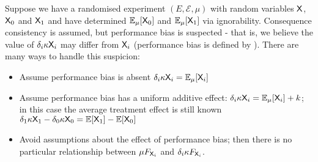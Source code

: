 \begin{example}\label{ex:nonst_distn}
Suppose we have a randomised experiment $(E,\mathcal{E},\mu)$ with random variables $\mathsf{X}$, $\mathsf{X}_0$ and $\mathsf{X}_1$ and have determined $\mathbb{E}_\mu[\mathsf{X}_0]$ and $\mathbb{E}_\mu[\mathsf{X}_1]$ via ignorability. Consequence consistency is assumed, but performance bias is suspected - that is, we believe the value of $\delta_i \kappa \mathsf{X}_i$ may differ from $\mathsf{X}_i$ (performance bias is defined by \cite{collaboration_cochrane_nodate}). There are many ways to handle this suspicion:
\begin{itemize}
    \item Assume performance bias is absent $\delta_i \kappa \mathsf{X}_i = \mathbb{E}_\mu[\mathsf{X}_i]$
    \item Assume performance bias has a uniform additive effect: $\delta_i \kappa \mathsf{X}_i = \mathbb{E}_\mu[\mathsf{X}_i]+k$; in this case the average treatment effect is still known $\delta_1 \kappa \mathsf{X}_1 - \delta_0\kappa\mathsf{X}_0 = \mathbb{E}[\mathsf{X}_1]-\mathbb{E}[\mathsf{X}_0]$
    \item Avoid assumptions about the effect of performance bias; then there is no particular relationship between $\mu F_{\mathsf{X}_i}$ and $\delta_i \kappa F_{\mathsf{X}_i}$.
\end{itemize}

\end{example}

